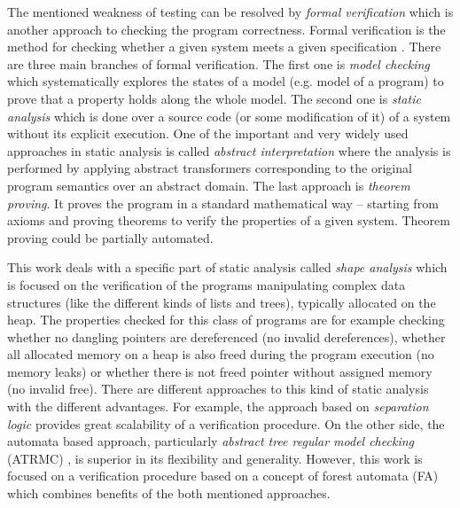 \documentclass[fleqn,11pt]{ExcelAtFIT} %
\begin{document}
The mentioned weakness of testing can be resolved by \emph{formal verification}
which is another approach to checking the program correctness.
Formal verification is the method for checking whether a given system meets a given specification \cite{fav:lecture}.
There are three main branches of formal verification.
The first one is \emph{model checking} which systematically explores the states of a model (e.g. model of a program) to
prove that a property holds along the whole model.
The second one is \emph{static analysis} which is done over a source code (or some modification of it) of a system
without its explicit execution.
One of the important and very widely used approaches in static analysis is called \emph{abstract interpretation} where the analysis is performed by
applying abstract transformers corresponding to the original program semantics over an abstract domain.
The last approach is \emph{theorem proving}.
It proves the program in a standard mathematical way -- starting from axioms and proving theorems to
verify the properties of a given system.
Theorem proving could be partially automated.

This work deals with a specific part of static analysis called \emph{shape analysis} which is focused on the verification of the programs manipulating
complex data structures (like the different kinds of lists and trees), typically allocated on the heap.
The properties checked for this class of programs are for example checking whether no dangling
pointers are dereferenced (no invalid dereferences), whether all allocated memory on a heap is also freed
during the program execution (no memory leaks) or whether there is not freed pointer without assigned memory (no invalid free).
There are different approaches to this kind of static analysis with the different advantages.
For example, the approach based on \emph{separation logic} \cite{seplog,seplog07} provides great scalability of a verification procedure.
On the other side, the automata based approach, particularly \emph{abstract tree regular model checking} (ATRMC) \cite{artmc}, is
superior in its flexibility and generality.
However, this work is focused on a verification procedure based on a concept of forest automata (FA) which
combines benefits of the both mentioned approaches.
\end{document}
